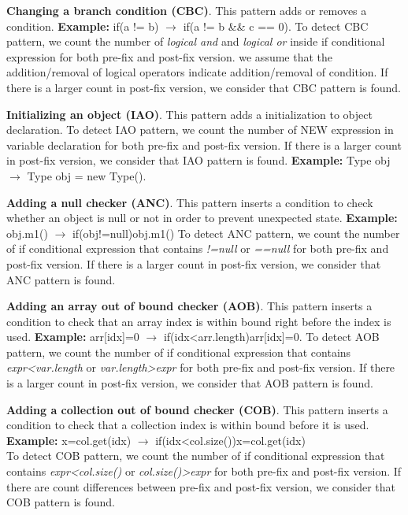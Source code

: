 \documentclass{sig-alternate-05-2015}
\begin{document}
\vspace{1ex}
\noindent
 {\bf Changing a branch condition (CBC)}. This pattern adds or removes a condition.
	{\bf Example:} if(a != b) $\rightarrow$ if(a != b \&\& c == 0).
  To detect CBC pattern, we count the number of { \em logical and} and {\em
    logical or} inside if conditional expression for both pre-fix and post-fix
  version. we assume that the addition/removal of logical operators indicate
  addition/removal of condition. If there is a larger count in post-fix version, we consider that CBC pattern is found.

\vspace{1ex}
\noindent
 {\bf Initializing an object (IAO)}. This pattern adds a initialization to object declaration.
  To detect IAO pattern, we count the number of NEW expression in variable
  declaration for both pre-fix and post-fix version. If there is a larger count in post-fix version, we consider that IAO pattern
  is found.
	{\bf Example:} Type obj $\rightarrow$ Type obj = new Type(). 

\vspace{1ex}
\noindent
 {\bf Adding a null checker (ANC)}.  This pattern inserts a condition to check whether an
    object is null or not in order to prevent unexpected state.
	{\bf Example:} obj.m1() $\rightarrow$ if(obj!=null){obj.m1()}
  To detect ANC pattern, we count the number of if conditional expression that
  contains {\em !=null} or {\em ==null} for both pre-fix and post-fix
  version. If there is a larger count in post-fix version,
  we consider that ANC pattern is found.

\vspace{1ex}
\noindent
 {\bf Adding an array out of bound checker (AOB)}. This pattern inserts a condition to check that an array
    index is within bound right before the index is used.
	{\bf Example:} arr[idx]=0 $\rightarrow$ if(idx<arr.length){arr[idx]=0}.
  To detect AOB pattern, we count the number of if conditional expression that
  contains {\em expr<var.length} or {\em var.length>expr} for both pre-fix and
  post-fix version. If there is a larger count in post-fix version, we consider that AOB pattern is found.

\vspace{1ex}
\noindent
 {\bf Adding a collection out of bound checker (COB)}.  This pattern inserts a condition to check that a
    collection index is within bound before it is used.
	{\bf Example:} x=col.get(idx) $\rightarrow$ if(idx<col.size()){x=col.get(idx)}\\
To detect COB pattern, we count the number of if conditional expression that
contains {\em expr<col.size()} or {\em col.size()>expr} for both pre-fix and
post-fix version. If there are count differences between pre-fix and post-fix
version, we consider that COB pattern is found.
\end{document}
